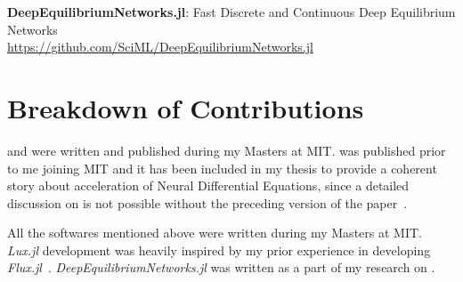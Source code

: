 \textbf{DeepEquilibriumNetworks.jl}: Fast Discrete and Continuous Deep Equilibrium Networks\\
{\small \url{https://github.com/SciML/DeepEquilibriumNetworks.jl}}

\section*{Breakdown of Contributions}

\citet{pal2022mixing} and \citet{pal2023locally} were written and published during my Masters at MIT. \citet{pal2021opening} was published prior to me joining MIT and it has been included in my thesis to provide a coherent story about acceleration of Neural Differential Equations, since a detailed discussion on \citet{pal2023locally} is not possible without the preceding version of the paper~\citep{pal2021opening}.

All the softwares mentioned above were written during my Masters at MIT. \textit{Lux.jl} development was heavily inspired by my prior experience in developing \textit{Flux.jl}~\citep{innes:2018, innes2018fashionable}. \textit{DeepEquilibriumNetworks.jl} was written as a part of my research on \citet{pal2022mixing}. 
